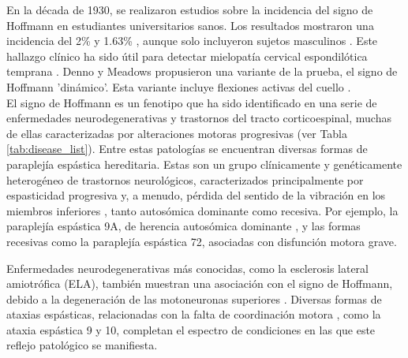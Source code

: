 En la década de 1930, se realizaron estudios sobre la incidencia del signo de Hoffmann en estudiantes universitarios sanos. Los resultados mostraron una incidencia del 2\% y 1.63\% \cite{echols1936hoffmann} \cite{fay1933clinical}, aunque solo incluyeron sujetos masculinos \cite{glaser2001cervical}. Este hallazgo clínico ha sido útil para detectar mielopatía cervical espondilótica temprana \cite{denno1991early}. Denno y Meadows propusieron una variante de la prueba, el signo de Hoffmann 'dinámico'. Esta variante incluye flexiones activas del cuello \cite{glaser2001cervical}.
\\
El signo de Hoffmann es un fenotipo que ha sido identificado en una serie de enfermedades neurodegenerativas y trastornos del tracto corticoespinal, muchas de ellas caracterizadas por alteraciones motoras progresivas (ver Tabla \ref{tab:disease_list}). Entre estas patologías se encuentran diversas formas de paraplejía espástica hereditaria. Estas son un grupo clínicamente y genéticamente heterogéneo de trastornos neurológicos, caracterizados principalmente por espasticidad progresiva y, a menudo, pérdida del sentido de la vibración en los miembros inferiores \cite{Esteves2014}, tanto autosómica dominante como recesiva. Por ejemplo, la paraplejía espástica 9A, de herencia autosómica dominante \cite{10.1093/brain/awv143/1}, y las formas recesivas como la paraplejía espástica 72, asociadas con disfunción motora grave.

Enfermedades neurodegenerativas más conocidas, como la esclerosis lateral amiotrófica (ELA), también muestran una asociación con el signo de Hoffmann, debido a la degeneración de las motoneuronas superiores \cite{RIANCHO201927}. Diversas formas de ataxias espásticas, relacionadas con la falta de coordinación motora \cite{Pedroso2022}, como la ataxia espástica 9 y 10, completan el espectro de condiciones en las que este reflejo patológico se manifiesta.

